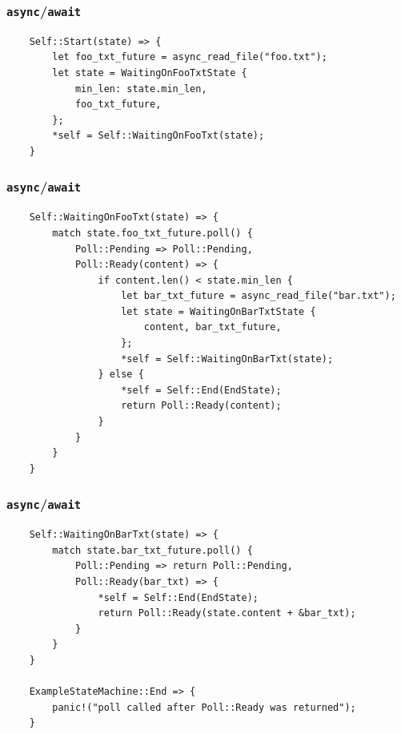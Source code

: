 \documentclass[aspectratio=1610,t]{beamer}
\begin{document}

\begin{frame}[fragile]
\frametitle{\texttt{async}/\texttt{await}}
\begin{verbatim}
    Self::Start(state) => {
        let foo_txt_future = async_read_file("foo.txt");
        let state = WaitingOnFooTxtState {
            min_len: state.min_len,
            foo_txt_future,
        };
        *self = Self::WaitingOnFooTxt(state);
    }
\end{verbatim}
\end{frame}


\begin{frame}[fragile]
\frametitle{\texttt{async}/\texttt{await}}
\begin{verbatim}
    Self::WaitingOnFooTxt(state) => {
        match state.foo_txt_future.poll() {
            Poll::Pending => Poll::Pending,
            Poll::Ready(content) => {
                if content.len() < state.min_len {
                    let bar_txt_future = async_read_file("bar.txt");
                    let state = WaitingOnBarTxtState {
                        content, bar_txt_future,
                    };
                    *self = Self::WaitingOnBarTxt(state);
                } else {
                    *self = Self::End(EndState);
                    return Poll::Ready(content);
                }
            }
        }
    }
\end{verbatim}
\end{frame}


\begin{frame}[fragile]
\frametitle{\texttt{async}/\texttt{await}}
\begin{verbatim}
    Self::WaitingOnBarTxt(state) => {
        match state.bar_txt_future.poll() {
            Poll::Pending => return Poll::Pending,
            Poll::Ready(bar_txt) => {
                *self = Self::End(EndState);
                return Poll::Ready(state.content + &bar_txt);
            }
        }
    }

    ExampleStateMachine::End => {
        panic!("poll called after Poll::Ready was returned");
    }
\end{verbatim}
\end{frame}
\end{document}
